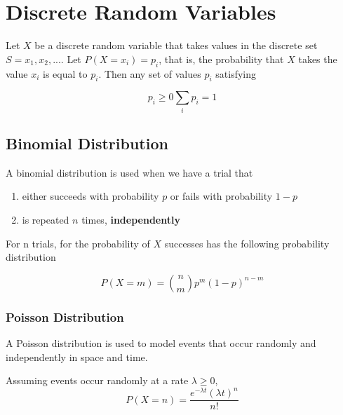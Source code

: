 \section{Discrete Random Variables} %
\label{sec:discrete_random_variables}

Let $X$ be a discrete random variable that takes values in the discrete set $S = {x_1, x_2, ...}$. Let $P(X = x_i) = p_i$, that is, the probability that $X$ takes the value $x_i$ is equal to $p_i$. Then any set of values $p_i$ satisfying

\begin{subequations}
  \begin{equation}
    p_i \geq 0
  \end{equation}
  \begin{equation}
    \sum_{i}p_i = 1
  \end{equation}
\end{subequations}

\subsection{Binomial Distribution} %
\label{sub:binomial_distribution}

A binomial distribution is used when we have a trial that
\begin{enumerate}
  \item either  succeeds with probability $p$ or fails with probability $1-p$
  \item is repeated $n$ times, \textbf{independently}
\end{enumerate}

For n trials, for the probability of $X$ successes has the following probability distribution

\begin{equation}
  P(X=m) = \binom{n}{m}p^m(1-p)^{n-m}
\end{equation}

\subsubsection{Poisson Distribution} %
\label{ssub:poisson_distribution}

A Poisson distribution is used to model events that occur randomly and independently in space and time.

Assuming events occur randomly at a rate $\lambda \geq 0$,
\begin{equation}
  P(X=n)=\frac{e^{- \lambda t}(\lambda t)^n}{n!}
\end{equation}
